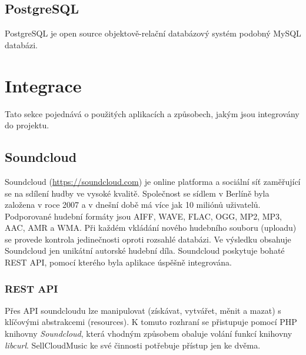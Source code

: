 \documentclass[12pt]{article}
\begin{document}
\subsection{PostgreSQL}
PostgreSQL je open source objektově-relační databázový systém podobný MySQL databázi.

\newpage

\section{Integrace}

Tato sekce pojednává o použitých aplikacích a způsobech, jakým jsou integrovány do projektu.

\subsection{Soundcloud}

Soundcloud (\url{https://soundcloud.com}) je online platforma a sociální síť zaměřující se na sdílení hudby ve vysoké kvalitě. Společnost se sídlem v Berlíně byla založena v roce 2007 a v dnešní době má více jak 10 miliónů uživatelů. Podporované hudební formáty jsou AIFF, WAVE, FLAC, OGG, MP2, MP3, AAC, AMR a WMA. Při každém vkládání nového hudebního souboru (uploadu) se provede kontrola jedinečnosti oproti rozsahlé databázi. Ve výsledku obsahuje Soundcloud jen unikátní autorské hudební díla. Soundcloud poskytuje bohaté REST API, pomocí kterého byla aplikace úspěšně integrována.

\subsubsection{REST API}

Přes API soundcloudu lze manipulovat (získávat, vytvářet, měnit a mazat) s klíčovými abstrakcemi (resources). K tomuto rozhraní se přistupuje pomocí PHP knihovny \emph{Soundcloud}, která vhodným způsobem obaluje volání funkcí knihovny \emph{libcurl}. SellCloudMusic ke své činnosti potřebuje přístup jen ke dvěma.
\end{document}
